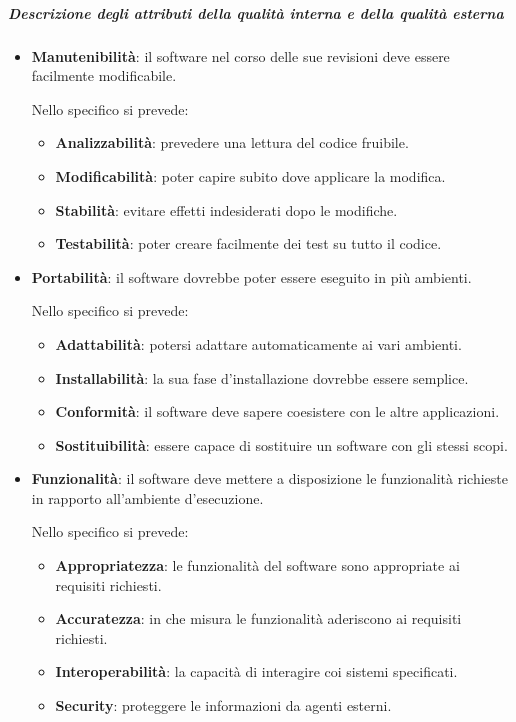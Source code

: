 		\subparagraph{Descrizione degli attributi della qualità interna e della qualità esterna}
		\begin{itemize}
			\item \textbf{Manutenibilità}: il software nel corso delle sue revisioni deve essere facilmente modificabile.

			Nello specifico si prevede:

			\begin{itemize}
				\item \textbf{Analizzabilità}: prevedere una lettura del codice fruibile.
				\item \textbf{Modificabilità}: poter capire subito dove applicare la modifica.
				\item \textbf{Stabilità}: evitare effetti indesiderati dopo le modifiche.
				\item \textbf{Testabilità}: poter creare facilmente dei test su tutto il codice.
			\end{itemize}

			\item \textbf{Portabilità}: il software dovrebbe poter essere eseguito in più ambienti.

			Nello specifico si prevede:

			\begin{itemize}
				\item \textbf{Adattabilità}: potersi adattare automaticamente ai vari ambienti.
				\item \textbf{Installabilità}: la sua fase d'installazione dovrebbe essere semplice.
				\item \textbf{Conformità}: il software deve sapere coesistere con le altre applicazioni.
				\item \textbf{Sostituibilità}: essere capace di sostituire un software con gli stessi scopi.
			\end{itemize}
			\newpage
			\item \textbf{Funzionalità}: il software deve mettere a disposizione le funzionalità richieste in rapporto all'ambiente d'esecuzione.

			Nello specifico si prevede:

			\begin{itemize}
				\item \textbf{Appropriatezza}: le funzionalità del software sono appropriate ai requisiti richiesti.
				\item \textbf{Accuratezza}: in che misura le funzionalità aderiscono ai requisiti richiesti.
				\item \textbf{Interoperabilità}: la capacità di interagire coi sistemi specificati.
				\item \textbf{Security}: proteggere le informazioni da agenti esterni.
			\end{itemize}


\end{itemize}
